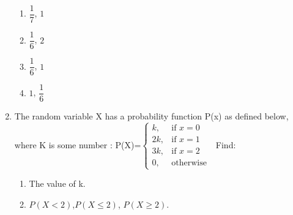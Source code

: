 \begin{enumerate}
\begin{enumerate}
\item $\dfrac{1}{7}$, $1$
\item $\dfrac{1}{6}$, $2$
\item $\dfrac{1}{6}$, $1$
\item $1$, $\dfrac{1}{6}$
\end{enumerate}
\item The random variable X has a probability function P(x) as defined below, where K is some number :
\newline P(X)=$\begin{cases} k, & \text{if }  x=0 \\ 2k, & \text{if } x=1\\ 3k, & \text{if } x=2\\ 0, & \text{otherwise  } \end{cases}$ 		
\newline Find:
\begin{enumerate}
\item The value of k.
\item $P(X<2)$,$P(X \le 2)$, $P(X \ge 2)$.
\end{enumerate}
\end{enumerate}
